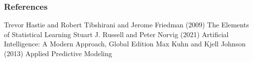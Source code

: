 \documentclass{beamer}
\begin{document}








\begin{frame}
\frametitle{References}
\footnotesize{
\begin{thebibliography}{99} %
 Trevor Hastie and Robert Tibshirani and Jerome Friedman (2009)
\newblock The Elements of Statistical Learning 
 Stuart J. Russell and Peter Norvig (2021)
\newblock Artificial Intelligence: A Modern Approach, Global Edition
 Max Kuhn and Kjell Johnson (2013)
\newblock Applied Predictive Modeling
\end{thebibliography}
}
\end{frame}



\end{document}

